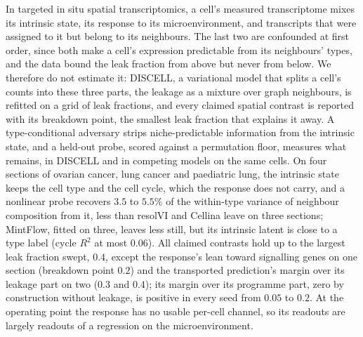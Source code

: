  In targeted in situ spatial transcriptomics, a cell's measured transcriptome mixes its intrinsic state, its response to its microenvironment, and transcripts that were assigned to it but belong to its neighbours. The last two are confounded at first order, since both make a cell's expression predictable from its neighbours' types, and the data bound the leak fraction from above but never from below. We therefore do not estimate it: DISCELL, a variational model that splits a cell's counts into these three parts, the leakage as a mixture over graph neighbours, is refitted on a grid of leak fractions, and every claimed spatial contrast is reported with its breakdown point, the smallest leak fraction that explains it away. A type-conditional adversary strips niche-predictable information from the intrinsic state, and a held-out probe, scored against a permutation floor, measures what remains, in DISCELL and in competing models on the same cells. On four sections of ovarian cancer, lung cancer and paediatric lung, the intrinsic state keeps the cell type and the cell cycle, which the response does not carry, and a nonlinear probe recovers $3.5$ to $5.5\%$ of the within-type variance of neighbour composition from it, less than resolVI and Cellina leave on three sections; MintFlow, fitted on three, leaves less still, but its intrinsic latent is close to a type label (cycle $R^2$ at most $0.06$). All claimed contrasts hold up to the largest leak fraction swept, $0.4$, except the response's lean toward signalling genes on one section (breakdown point $0.2$) and the transported prediction's margin over its leakage part on two ($0.3$ and $0.4$); its margin over its programme part, zero by construction without leakage, is positive in every seed from $0.05$ to $0.2$. At the operating point the response has no usable per-cell channel, so its readouts are largely readouts of a regression on the microenvironment.

